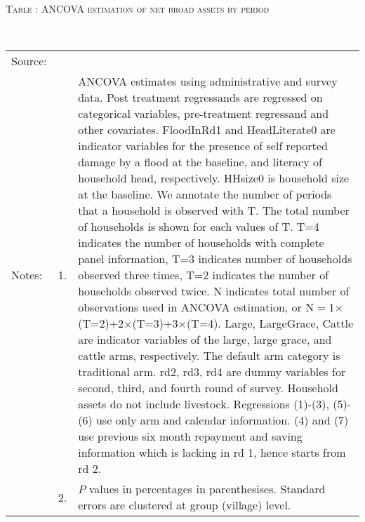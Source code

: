 \hspace{-1cm}\begin{minipage}[t]{14cm}
\hfil\textsc{\normalsize Table \thetable: ANCOVA estimation of net broad assets by period\label{tab ANCOVA net broad assets timevarying}}\\
\setlength{\tabcolsep}{1pt}
\setlength{\baselineskip}{8pt}
\renewcommand{\arraystretch}{.55}
\hfil{}\\
\renewcommand{\arraystretch}{.8}
\setlength{\tabcolsep}{1pt}
\begin{tabular}{>{\hfill\scriptsize}p{1cm}<{}>{\hfill\scriptsize}p{.25cm}<{}>{\scriptsize}p{12cm}<{\hfill}}
Source:& \multicolumn{2}{l}{\scriptsize Estimated with GUK administrative and survey data.}\\
Notes: & 1. & ANCOVA estimates using administrative and survey data. Post treatment regressands are regressed on categorical variables, pre-treatment regressand and other covariates. \textsf{FloodInRd1} and \textsf{HeadLiterate0} are indicator variables for the presence of self reported damage by a flood at the baseline, and literacy of household head, respectively. \textsf{HHsize0} is household size at the baseline. We annotate the number of periods that a household is observed with \textsf{T}. The total number of households is shown for each values of \textsf{T}. \textsf{T=4} indicates the number of households with complete panel information, \textsf{T=3} indicates number of households observed three times, \textsf{T=2} indicates the number of households observed twice. \textsf{N} indicates total number of observations used in ANCOVA estimation, or \textsf{N$=$1$\times$(T=2)+2$\times$(T=3)+3$\times$(T=4)}.  \textsf{Large}, \textsf{LargeGrace}, \textsf{Cattle} are indicator variables of the \textsf{large}, \textsf{large grace}, and \textsf{cattle} arms, respectively. The default arm category is \textsf{traditional} arm. \textsf{rd2, rd3, rd4} are dummy variables for second, third, and fourth round of survey.  Household assets do not include livestock. Regressions (1)-(3), (5)-(6) use only arm and calendar information. (4) and (7) use previous six month repayment and saving information which is lacking in rd 1, hence starts from rd 2.\\
& 2. & $P$ values in percentages in parenthesises. Standard errors are clustered at group (village) level.
\end{tabular}
\end{minipage}


